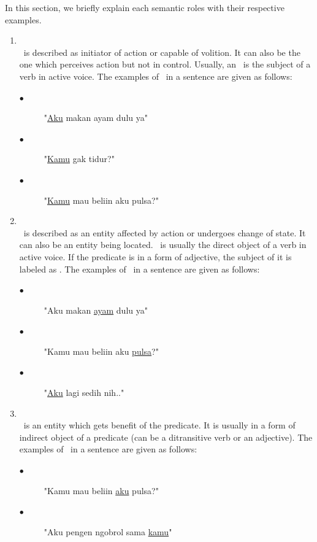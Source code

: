 In this section, we briefly explain each semantic roles with their respective examples.
\begin{enumerate}
	\item \agent\\
	\agent~is described as initiator of action or capable of volition. It can also be the one which perceives action but not in control. Usually, an \agent~is the subject of a verb in active voice.
	The examples of \agent~in a sentence are given as follows:
	\begin{description}
		\item[$\bullet$] "\underline{Aku} makan ayam dulu ya"
		\item[$\bullet$] "\underline{Kamu} gak tidur?"
		\item[$\bullet$] "\underline{Kamu} mau beliin aku pulsa?"
	\end{description}
	
	\item \patient\\
	\patient~is described as an entity affected by action or undergoes change of state. It can also be an entity being located. \patient~is usually the direct object of a verb in active voice. If the predicate is in a form of adjective, the subject of it is labeled as \patient. The examples of \patient~in a sentence are given as follows:
	\begin{description}
		\item[$\bullet$] "Aku makan \underline{ayam} dulu ya"
		\item[$\bullet$] "Kamu mau beliin aku \underline{pulsa}?"
		\item[$\bullet$] "\underline{Aku} lagi sedih nih.."
	\end{description}

	\item \beneficiary\\
	\beneficiary~is an entity which gets benefit of the predicate. It is usually in a form of indirect object of a predicate (can be a ditransitive verb or an adjective). The examples of \beneficiary~in a sentence are given as follows:
	\begin{description}
		\item[$\bullet$] "Kamu mau beliin \underline{aku} pulsa?"
		\item[$\bullet$] "Aku pengen ngobrol sama \underline{kamu}"
	\end{description}
	

\end{enumerate}
